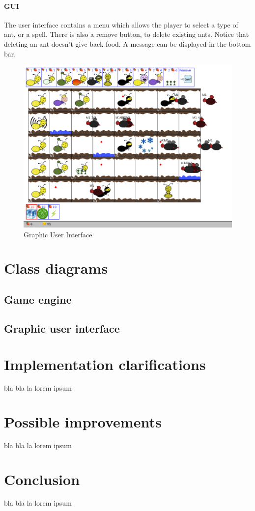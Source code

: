 \documentclass[a4paper]{article}
\begin{document}
\paragraph{GUI} The user interface contains a menu which allows the player to select a type of ant, or a spell. There is also a remove button, to delete existing ants. Notice that deleting an ant doesn't give back food. A message can be displayed in the bottom bar.

\begin{figure}[H]
	\center
	\includegraphics[scale=0.3]{screen2.png}
	\caption{Graphic User Interface}
	\label{gui}
\end{figure}


\section{Class diagrams}
	\subsection{Game engine}
	\subsection{Graphic user interface}


\section{Implementation clarifications}
bla bla la lorem ipsum

\section{Possible improvements}
bla bla la lorem ipsum

\section*{Conclusion}
bla bla la lorem ipsum
\end{document}
